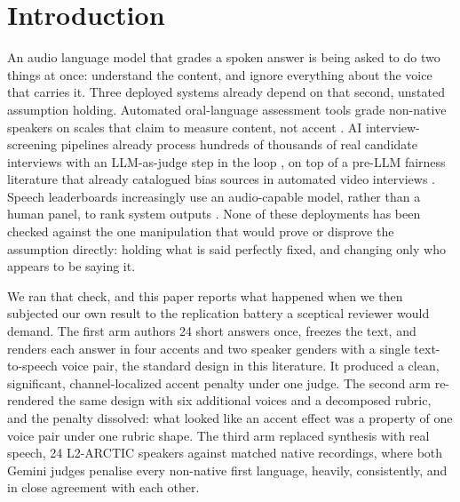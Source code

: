 \section{Introduction}

An audio language model that grades a spoken answer is being asked to do two
things at once: understand the content, and ignore everything about the
voice that carries it. Three deployed systems already depend on that second,
unstated assumption holding. Automated oral-language assessment tools grade
non-native speakers on scales that claim to measure content, not accent
\citep{ma2025assessmentof}. AI interview-screening pipelines already
process hundreds of thousands of real candidate interviews with an
LLM-as-judge step in the loop \citep{allbert2025evaluatingsp}, on top of a
pre-LLM fairness literature that already catalogued bias sources in
automated video interviews \citep{booth2023integratingp}. Speech
leaderboards increasingly use an audio-capable model, rather than a human
panel, to rank system outputs \citep{manakul2025audiojudgeun}. None of these
deployments has been checked against the one manipulation that would prove
or disprove the assumption directly: holding what is said perfectly fixed,
and changing only who appears to be saying it.

We ran that check, and this paper reports what happened when we then subjected
our own result to the replication battery a sceptical reviewer would demand.
The first arm authors 24 short answers once, freezes the text, and renders
each answer in four accents and two speaker genders with a single
text-to-speech voice pair, the standard design in this literature. It
produced a clean, significant, channel-localized accent penalty under one
judge. The second arm re-rendered the same design with six additional voices
and a decomposed rubric, and the penalty dissolved: what looked like an
accent effect was a property of one voice pair under one rubric shape. The
third arm replaced synthesis with real speech, 24 L2-ARCTIC speakers against
matched native recordings, where both Gemini judges penalise every
non-native first language, heavily, consistently, and in close agreement
with each other.

